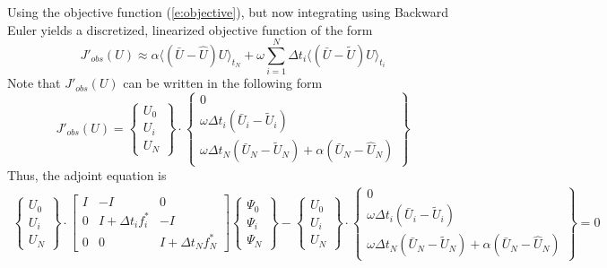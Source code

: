 \documentclass[10pt]{article}
\begin{document}
Using the objective function (\ref{e:objective}), but now integrating using
Backward Euler yields a discretized, linearized objective function of the form
\begin{equation}
J'_{obs}(U) \approx \alpha \langle (\bar U-\hat U) U \rangle_{t_N} +
\omega \sum_{i=1}^{N} \Delta t_i \langle (\bar U-\tilde U) U \rangle_{t_i} 
\end{equation}
Note that $J'_{obs}(U)$ can be written in the following form
\begin{equation}
J'_{obs}(U) = 
\left\{\begin{array}{c} U_0 \\ U_i \\ U_N \end{array}\right\}
\cdot
\left\{\begin{array}{c} 
0 \\ 
\omega\Delta t_i(\bar U_i - \tilde U_i) \\ 
\omega\Delta t_N(\bar U_N - \tilde U_N) + \alpha (\bar U_N - \hat U_N)
\end{array}\right\}
\end{equation}
Thus, the adjoint equation is
\begin{eqnarray}
\left\{\begin{array}{c} U_0 \\ U_i \\ U_N \end{array}\right\}
\cdot
\left[ \begin{array}{ccc} 
I & -I & 0 \\
0 & I + \Delta t_i f^*_i & -I \\
0 &  0 & I + \Delta t_N f^*_N
\end{array} \right] 
\left\{\begin{array}{c} \Psi_0 \\ \Psi_i \\ \Psi_N \end{array} \right\} - 
\left\{\begin{array}{c} U_0 \\ U_i \\ U_N \end{array}\right\}
\cdot
\left\{\begin{array}{c} 
0 \\ 
\omega\Delta t_i (\bar U_i - \tilde U_i) \\ 
\omega\Delta t_N (\bar U_N - \tilde U_N) + \alpha (\bar U_N - \hat U_N)
\end{array}\right\} = 0
\end{eqnarray}
\end{document}
